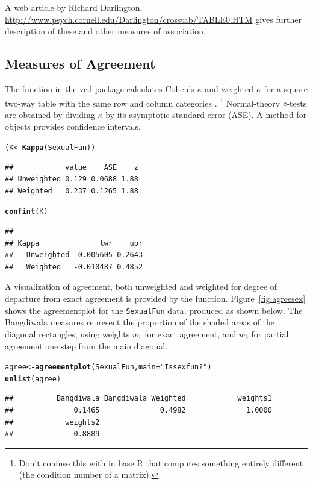 \documentclass[10pt,twoside]{article}\usepackage[]{graphicx}\usepackage[]{color}
\makeatletter
\newcommand{\hlstr}[1]{\textcolor[rgb]{0.192,0.494,0.8}{#1}}%
\newcommand{\hlstd}[1]{\textcolor[rgb]{0.345,0.345,0.345}{#1}}%
\newcommand{\hlkwb}[1]{\textcolor[rgb]{0.69,0.353,0.396}{#1}}%
\newcommand{\hlkwc}[1]{\textcolor[rgb]{0.333,0.667,0.333}{#1}}%
\newcommand{\hlkwd}[1]{\textcolor[rgb]{0.737,0.353,0.396}{\textbf{#1}}}%
\newenvironment{kframe}{%
 \def\at@end@of@kframe{}%
 \ifinner\ifhmode%
  \def\at@end@of@kframe{\end{minipage}}%
  \begin{minipage}{\columnwidth}%
 \fi\fi%
 \def\FrameCommand##1{\hskip\@totalleftmargin \hskip-\fboxsep
 \colorbox{shadecolor}{##1}\hskip-\fboxsep
     \hskip-\linewidth \hskip-\@totalleftmargin \hskip\columnwidth}%
 \MakeFramed {\advance\hsize-\width
   \@totalleftmargin\z@ \linewidth\hsize
   \@setminipage}}%
 {\par\unskip\endMakeFramed%
 \at@end@of@kframe}
\newenvironment{knitrout}{}{} %
\newcommand{\figref}[1]{Figure~\ref{#1}}
\newcommand{\data}[1]{\texttt{#1}}
\newcommand{\codefun}[1]{\code{#1()}}
\let\proglang=\textsf
\newcommand{\pkg}[1]{{\normalfont\fontseries{b}\selectfont #1}}
\makeatother
\begin{document}
A web article by Richard Darlington,
\url{http://www.psych.cornell.edu/Darlington/crosstab/TABLE0.HTM}
gives further description of these and other measures of association.

\subsection{Measures of Agreement}
The
\codefun{Kappa} function in the \pkg{vcd} package calculates Cohen's $\kappa$ and weighted
$\kappa$ for a square two-way table with the same row and column categories \citep{Cohen:60}.%
\footnote{ 
Don't confuse this with \codefun{kappa} in base \proglang{R} that computes something
entirely different (the condition number of a matrix).
}
Normal-theory $z$-tests are obtained by dividing $\kappa$ by its asymptotic standard
error (ASE).  A \codefun{confint} method for  objects provides confidence intervals.
\begin{knitrout}
\color{fgcolor}\begin{kframe}
\begin{alltt}
\hlstd{(K} \hlkwb{<-} \hlkwd{Kappa}\hlstd{(SexualFun))}
\end{alltt}
\begin{verbatim}
##            value    ASE    z
## Unweighted 0.129 0.0688 1.88
## Weighted   0.237 0.1265 1.88
\end{verbatim}
\begin{alltt}
\hlkwd{confint}\hlstd{(K)}
\end{alltt}
\begin{verbatim}
##             
## Kappa              lwr    upr
##   Unweighted -0.005605 0.2643
##   Weighted   -0.010487 0.4852
\end{verbatim}
\end{kframe}
\end{knitrout}


A visualization of agreement, both unweighted and weighted for degree of departure
from exact agreement is provided by the \codefun{agreementplot} function.
\figref{fig:agreesex} shows the agreementplot for the \data{SexualFun} data,
produced as shown below. The Bangdiwala measures represent the proportion of the
shaded areas of the diagonal rectangles, using weights $w_1$ for exact agreement,
and $w_2$ for partial agreement one step from the main diagonal.
\begin{knitrout}
\color{fgcolor}\begin{kframe}
\begin{alltt}
\hlstd{agree} \hlkwb{<-} \hlkwd{agreementplot}\hlstd{(SexualFun,} \hlkwc{main}\hlstd{=}\hlstr{"Is sex fun?"}\hlstd{)}
\hlkwd{unlist}\hlstd{(agree)}
\end{alltt}
\begin{verbatim}
##          Bangdiwala Bangdiwala_Weighted            weights1 
##              0.1465              0.4982              1.0000 
##            weights2 
##              0.8889
\end{verbatim}
\end{kframe}
\end{knitrout}
\end{document}
